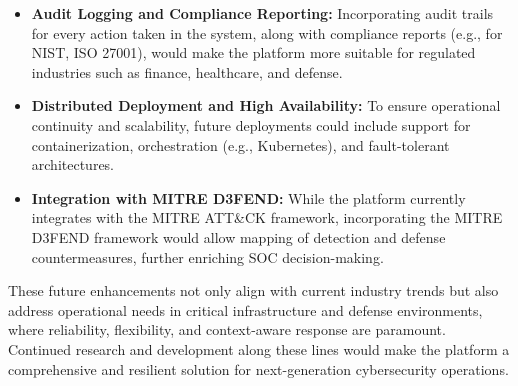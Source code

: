 \begin{itemize}
    \item \textbf{Audit Logging and Compliance Reporting:} Incorporating audit trails for every action taken in the system, along with compliance reports (e.g., for NIST, ISO 27001), would make the platform more suitable for regulated industries such as finance, healthcare, and defense.

    \item \textbf{Distributed Deployment and High Availability:} To ensure operational continuity and scalability, future deployments could include support for containerization, orchestration (e.g., Kubernetes), and fault-tolerant architectures.

    \item \textbf{Integration with MITRE D3FEND:} While the platform currently integrates with the MITRE ATT\&CK framework, incorporating the MITRE D3FEND framework would allow mapping of detection and defense countermeasures, further enriching SOC decision-making.

\end{itemize}

These future enhancements not only align with current industry trends but also address operational needs in critical infrastructure and defense environments, where reliability, flexibility, and context-aware response are paramount. Continued research and development along these lines would make the platform a comprehensive and resilient solution for next-generation cybersecurity operations.
